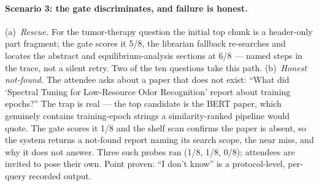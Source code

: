 \paragraph{Scenario 3: the gate discriminates, and failure is honest.}
(a)~\emph{Rescue.} For the tumor-therapy question the initial top chunk is a
header-only part fragment; the gate scores it 5/8, the librarian fallback
re-searches and locates the abstract and equilibrium-analysis sections at 6/8
--- named steps in the trace, not a silent retry. Two of the ten
questions take this path.
(b)~\emph{Honest not-found.} The attendee asks about a paper that does not exist:
``What did `Spectral Tuning for Low-Resource Odor Recognition' report about training
epochs?'' The trap is real --- the top candidate is the BERT paper, which genuinely
contains training-epoch strings a similarity-ranked pipeline would quote.
The gate scores it 1/8 and the shelf scan confirms the paper is absent, so the
system returns a not-found report naming its search scope, the near miss, and why
it does not answer. Three such probes ran (1/8, 1/8, 0/8); attendees are
invited to pose their own. Point proven:
``I don't know'' is a protocol-level, per-query recorded output.
